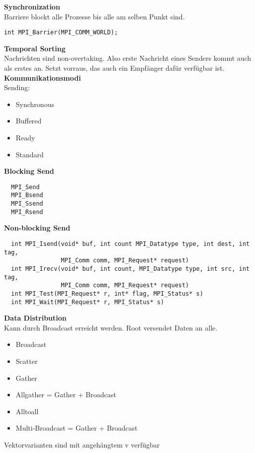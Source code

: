 \textbf{Synchronization}\\
Barriere blockt alle Prozesse bis alle am selben Punkt sind.
\begin{lstlisting}
int MPI_Barrier(MPI_COMM_WORLD);
\end{lstlisting}

\textbf{Temporal Sorting}\\
Nachrichten sind non-overtaking. Also erste Nachricht eines Senders kommt auch als erstes an. Setzt vorraus, das auch ein
Empfänger dafür verfügbar ist.\\

\textbf{Kommunikationsmodi}\\
Sending:
\begin{itemize}
  \item Synchronous
  \item Buffered
  \item Ready
  \item Standard
  \end{itemize}
  
\textbf{Blocking Send}
\begin{lstlisting}
  MPI_Send
  MPI_Bsend
  MPI_Ssend
  MPI_Rsend
\end{lstlisting}

\newpage
\textbf{Non-blocking Send}
\begin{lstlisting}
  int MPI_Isend(void* buf, int count MPI_Datatype type, int dest, int tag, 
                MPI_Comm comm, MPI_Request* request)
  int MPI_Irecv(void* buf, int count, MPI_Datatype type, int src, int tag, 
                MPI_Comm comm, MPI_Request* request)
  int MPI_Test(MPI_Request* r, int* flag, MPI_Status* s)
  int MPI_Wait(MPI_Request* r, MPI_Status* s)
\end{lstlisting}

\textbf{Data Distribution}\\
Kann durch Broadcast erreicht werden. Root versendet Daten an alle.
\begin{itemize}
  \item Broadcast
  \item Scatter
  \item Gather
  \item Allgather = Gather + Broadcast
  \item Alltoall
  \item Multi-Broadcast = Gather + Broadcast
\end{itemize}
Vektorvarianten sind mit angehängtem v verfügbar\\

